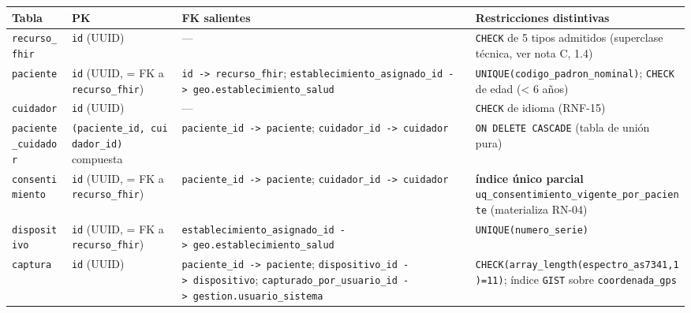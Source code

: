\documentclass[11pt,a4paper]{article}
\begin{document}
{\small
\begin{longtable}[]{@{}
  >{\raggedright\arraybackslash}p{}
  >{\raggedright\arraybackslash}p{}
  >{\raggedright\arraybackslash}p{}
  >{\raggedright\arraybackslash}p{}@{}}
\toprule\noalign{}
\begin{minipage}[b]{\linewidth}\raggedright
Tabla
\end{minipage} & \begin{minipage}[b]{\linewidth}\raggedright
PK
\end{minipage} & \begin{minipage}[b]{\linewidth}\raggedright
FK salientes
\end{minipage} & \begin{minipage}[b]{\linewidth}\raggedright
Restricciones distintivas
\end{minipage} \\
\midrule\noalign{}
\endhead
\bottomrule\noalign{}
\endlastfoot
\texttt{recurso\_fhir} & \texttt{id} (UUID) & --- & \texttt{CHECK} de 5 tipos admitidos (superclase técnica, ver nota C, 1.4) \\
\texttt{paciente} & \texttt{id} (UUID, = FK a \texttt{recurso\_fhir}) & \texttt{id\ -\textgreater{}\ recurso\_fhir}; \texttt{establecimiento\_asignado\_id\ -\textgreater{}\ geo.establecimiento\_salud} & \texttt{UNIQUE(codigo\_padron\_nominal)}; \texttt{CHECK} de edad (\textless{} 6 años) \\
\texttt{cuidador} & \texttt{id} (UUID) & --- & \texttt{CHECK} de idioma (RNF-15) \\
\texttt{paciente\_cuidador} & \texttt{(paciente\_id,\ cuidador\_id)} compuesta & \texttt{paciente\_id\ -\textgreater{}\ paciente}; \texttt{cuidador\_id\ -\textgreater{}\ cuidador} & \texttt{ON\ DELETE\ CASCADE} (tabla de unión pura) \\
\texttt{consentimiento} & \texttt{id} (UUID, = FK a \texttt{recurso\_fhir}) & \texttt{paciente\_id\ -\textgreater{}\ paciente}; \texttt{cuidador\_id\ -\textgreater{}\ cuidador} & \textbf{índice único parcial} \texttt{uq\_consentimiento\_vigente\_por\_paciente} (materializa RN-04) \\
\texttt{dispositivo} & \texttt{id} (UUID, = FK a \texttt{recurso\_fhir}) & \texttt{establecimiento\_asignado\_id\ -\textgreater{}\ geo.establecimiento\_salud} & \texttt{UNIQUE(numero\_serie)} \\
\texttt{captura} & \texttt{id} (UUID) & \texttt{paciente\_id\ -\textgreater{}\ paciente}; \texttt{dispositivo\_id\ -\textgreater{}\ dispositivo}; \texttt{capturado\_por\_usuario\_id\ -\textgreater{}\ gestion.usuario\_sistema} & \texttt{CHECK(array\_length(espectro\_as7341,1)=11)}; índice \texttt{GIST} sobre \texttt{coordenada\_gps} \\

\end{longtable}}
\end{document}
